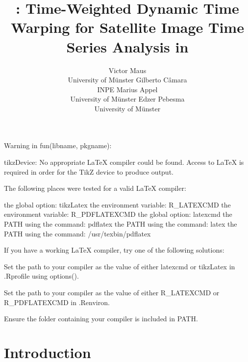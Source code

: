 \documentclass[article,shortnames]{jss}
\author{
Victor Maus\\University of Münster \And Gilberto Câmara\\INPE \And Marius Appel\\University of Münster \And Edzer Pebesma\\University of Münster
}
\title{\pkg{dtwSat}: Time-Weighted Dynamic Time Warping for Satellite Image
Time Series Analysis in \proglang{R}}
\begin{document}
\begin{CodeChunk}

\begin{CodeOutput}
Warning in fun(libname, pkgname): 

tikzDevice: No appropriate LaTeX compiler could be found.
Access to LaTeX is required in order for the TikZ device
to produce output.

The following places were tested for a valid LaTeX compiler:

    the global option: tikzLatex
    the environment variable: R_LATEXCMD
    the environment variable: R_PDFLATEXCMD
    the global option: latexcmd
    the PATH using the command: pdflatex
    the PATH using the command: latex
    the PATH using the command: /usr/texbin/pdflatex

If you have a working LaTeX compiler, try one of the
following solutions:

    Set the path to your compiler as the value of either latexcmd or
    tikzLatex in .Rprofile using options().

    Set the path to your compiler as the value of either R_LATEXCMD or
    R_PDFLATEXCMD in .Renviron.

    Ensure the folder containing your compiler is included in PATH.
\end{CodeOutput}
\end{CodeChunk}

\sloppy

\hypertarget{introduction}{%
\section{Introduction}\label{introduction}}
\end{document}
